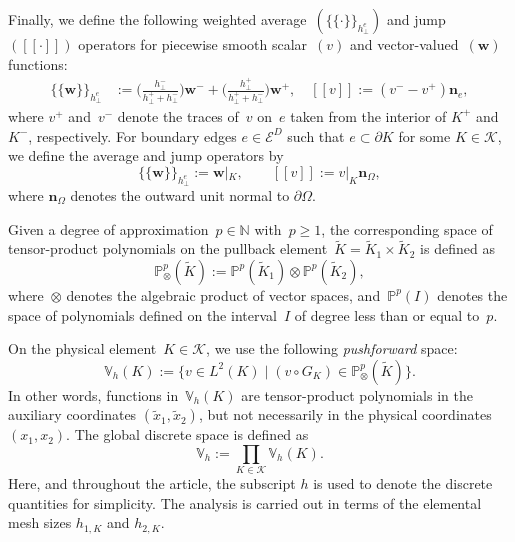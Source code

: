 \documentclass[a4paper,twoside,10pt]{article}
\newcommand{\jmp}[1]{[\![ #1 ]\!]}
\newcommand{\IP}{\mathbb{P}}
\newcommand{\calE}{\mathcal{E}}
\newcommand{\calK}{\mathcal{K}}
\newcommand{\bn}{\mathbf{n}}
\newcommand{\bw}{\boldsymbol{w}}
\numberwithin{equation}{section}
\newcommand{\N}{\mathbb{N}}
\newcommand{\Vh}{\mathbb{V}_{\! h}}
\newcommand{\VK}{\mathbb{V}_h(K)}
\newcommand{\hperp}{h_{\perp}}
\newcommand{\GK}{G_K}
\newcommand{\Kt}{\widetilde{K}}
\newcommand{\hKot}{h_{1,K}}
\newcommand{\hKtt}{h_{2,K}}
\newcommand{\xt}{\widetilde{x}}
\newcommand{\mvl}[1]{\{\!\!\{#1\}\!\!\}}
\begin{document}
	Finally, we define the following weighted average~$(\mvl{\cdot}_{\hperp^e})$ and 
	jump~$(\jmp{\cdot})$ operators for piecewise smooth scalar~$(v)$ and vector-valued~$(\bw)$ functions:
	\begin{align}\label{eq:averages-jumps}
	     \mvl{\bw}_{\hperp^e} &:= \Big(\frac{\hperp^-}{\hperp^+ + \hperp^-}\Big) \bw^- + \Big(\frac{\hperp^+}{\hperp^+ + \hperp^-}\Big) \bw^+ , 
	    \quad \jmp{v} := (v^- - v^+)\bn_e, 
	\end{align}
	where 
	$v^+$ and~$v^-$ denote the traces of~$v$ on~$e$ taken from the interior of $K^+$ and~$K^-$, respectively.
	For boundary edges $e \in \calE^D$ such that $e\subset \partial K$ for some $K\in\calK$, we define the average and jump operators by
	\[
	\mvl{\bw}_{\hperp^e} := \bw|_K, 
	\qquad 
	\jmp{v} := v|_K  \bn_{\Omega},
	\]
	where $\bn_{\Omega}$ denotes the outward unit normal to $\partial\Omega$.
	
	Given a degree of approximation~$p \in \N$ with~$p \geq 1$, the corresponding space of tensor-product polynomials on the pullback element~$\Kt = \Kt_1 \times \Kt_2$ is defined as
	\begin{equation*}
		\IP^p_\otimes(\Kt):= \IP^p(\Kt_1) \otimes \IP^p(\Kt_2),
	\end{equation*}
	where~$\otimes$ denotes the algebraic
	product of vector spaces, and~$\IP^p(I)$ denotes the space of polynomials defined on the interval~$I$ of degree less than or equal to~$p$.
	
	On the physical element~$K \in \calK$, we use the following \emph{pushforward} space: 
	\begin{equation*}
	\VK
	 := \{v \in L^2(K) \mid (v \circ \GK) \in \IP^p_\otimes(\Kt)\}.
	\end{equation*}
	In other words, functions in~$\VK$ are tensor-product polynomials in the auxiliary coordinates $(\xt_1, \xt_2)$, but not necessarily in the physical coordinates~$(x_1, x_2)$. The global discrete space is defined as 
	\begin{equation*}
		\Vh:= \prod_{K \in \calK} \VK.
	\end{equation*}
	Here, and throughout the article, the subscript $h$ is used to denote the discrete quantities for simplicity. The analysis  is carried out in terms of the elemental mesh sizes $\hKot$ and $\hKtt$.
	
\end{document}
